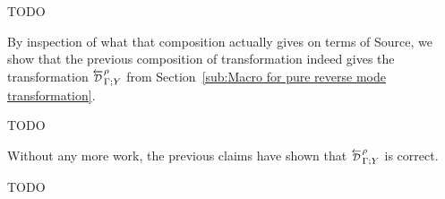 \begin{theorem}
    TODO
\end{theorem}

By inspection of what that composition actually gives on terms of Source, 
we show that the previous composition of transformation indeed gives the transformation 
$\directD{\rho}{\Gamma}{Y}$ from Section~\ref{sub:Macro for pure reverse mode transformation}. 

\begin{proposition}[UNF;D;$UNF^-1$=D]
    TODO
\end{proposition}

Without any more work, the previous claims have shown that 
$\directD{\rho}{\Gamma}{Y}$ is correct.

\begin{theorem}[D is correct]
    TODO
\end{theorem}